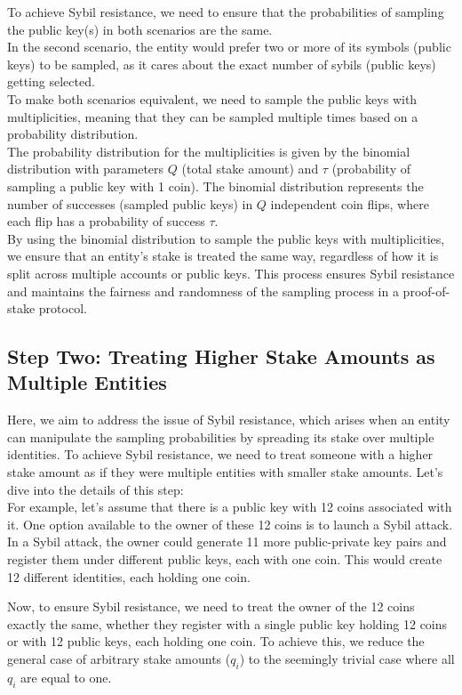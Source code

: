 To achieve Sybil resistance, we need to ensure that the probabilities of sampling the public key(s) in both scenarios are the same.\\
In the second scenario, the entity would prefer two or more of its symbols (public keys) to be sampled, as it cares about the exact number of sybils (public keys) getting selected.\\
To make both scenarios equivalent, we need to sample the public keys with multiplicities, meaning that they can be sampled multiple times based on a probability distribution.\\
The probability distribution for the multiplicities is given by the binomial distribution with parameters $Q$ (total stake amount) and $\tau$ (probability of sampling a public key with 1 coin). The binomial distribution represents the number of successes (sampled public keys) in $Q$ independent coin flips, where each flip has a probability of success $\tau$.\\
By using the binomial distribution to sample the public keys with multiplicities, we ensure that an entity's stake is treated the same way, regardless of how it is split across multiple accounts or public keys. This process ensures Sybil resistance and maintains the fairness and randomness of the sampling process in a proof-of-stake protocol.

\subsection{Step Two: Treating Higher Stake Amounts as Multiple Entities}
Here, we aim to address the issue of Sybil resistance, which arises when an entity can manipulate the sampling probabilities by spreading its stake over multiple identities. To achieve Sybil resistance, we need to treat someone with a higher stake amount as if they were multiple entities with smaller stake amounts. Let's dive into the details of this step:\\

For example, let's assume that there is a public key with 12 coins associated with it. One option available to the owner of these 12 coins is to launch a Sybil attack. In a Sybil attack, the owner could generate 11 more public-private key pairs and register them under different public keys, each with one coin. This would create 12 different identities, each holding one coin.

Now, to ensure Sybil resistance, we need to treat the owner of the 12 coins exactly the same, whether they register with a single public key holding 12 coins or with 12 public keys, each holding one coin. To achieve this, we reduce the general case of arbitrary stake amounts ($q_i$) to the seemingly trivial case where all $q_i$ are equal to one.

